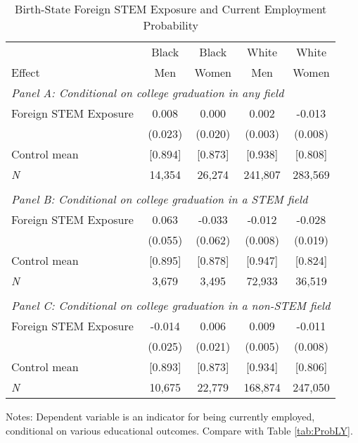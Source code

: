 \begin{table}[ht]
\caption{Birth-State Foreign STEM Exposure and Current Employment Probability}
\label{tab:empProb}
\centering
\begin{threeparttable}
\begin{tabular}{lcccc}
\toprule 
       & Black           & Black        & White        & White       \\
Effect & Men             & Women        & Men          & Women       \\
\midrule 
\multicolumn{5}{l}{\emph{Panel A: Conditional on college graduation in any field}}\\ 
Foreign STEM Exposure & 0.008  & 0.000  & 0.002  & -0.013  \\ 
 &  (0.023) & (0.020) & (0.003) & (0.008) \\ 
Control mean &  [0.894] & [0.873] & [0.938] & [0.808] \\ 
\emph{N} &     14,354 &    26,274 &   241,807 &   283,569 \\ 
&&&&\\
\multicolumn{5}{l}{\emph{Panel B: Conditional on college graduation in a STEM field}}\\ 
Foreign STEM Exposure & 0.063  & -0.033  & -0.012  & -0.028  \\ 
 &  (0.055) & (0.062) & (0.008) & (0.019) \\ 
Control mean &  [0.895] & [0.878] & [0.947] & [0.824] \\ 
\emph{N} &      3,679 &     3,495 &    72,933 &    36,519 \\ 
&&&&\\
\multicolumn{5}{l}{\emph{Panel C: Conditional on college graduation in a non-STEM field}}\\ 
Foreign STEM Exposure & -0.014  & 0.006  & 0.009  & -0.011  \\ 
 &  (0.025) & (0.021) & (0.005) & (0.008) \\ 
Control mean &  [0.893] & [0.873] & [0.934] & [0.806] \\ 
\emph{N} &     10,675 &    22,779 &   168,874 &   247,050 \\ 
\bottomrule 
\end{tabular} 
\footnotesize Notes: Dependent variable is an indicator for being currently employed, conditional on various educational outcomes.  Compare with Table \ref{tab:ProbLY}.
\end{threeparttable} 
\end{table} 
